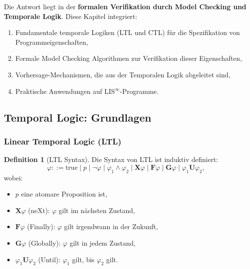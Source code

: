 \documentclass[a4paper,12pt]{article}
\theoremstyle{definition}
\newtheorem{definition}{Definition}
\begin{document}
Die Antwort liegt in der \textbf{formalen Verifikation durch Model Checking und Temporale Logik}. Diese Kapitel integriert:

\begin{enumerate}
	\item Fundamentale temporale Logiken (LTL und CTL) für die Spezifikation von Programmeigenschaften,
	\item Formale Model Checking Algorithmen zur Verifikation dieser Eigenschaften,
	\item Vorhersage-Mechanismen, die aus der Temporalen Logik abgeleitet sind,
	\item Praktische Anwendungen auf LIS$^{\infty}$-Programme.
\end{enumerate}

\subsection{Temporal Logic: Grundlagen}

\subsubsection{Linear Temporal Logic (LTL)}

\begin{definition}[LTL Syntax]
	\label{def:ltl_syntax}
	Die Syntax von LTL ist induktiv definiert:
	\[
	\varphi ::= \text{true} \mid p \mid \neg \varphi \mid \varphi_1 \land \varphi_2 \mid \mathbf{X}\varphi \mid \mathbf{F}\varphi \mid \mathbf{G}\varphi \mid \varphi_1 \mathbf{U} \varphi_2,
	\]
	wobei:
	\begin{itemize}
		\item $p$ eine atomare Proposition ist,
		\item $\mathbf{X}\varphi$ (neXt): $\varphi$ gilt im nächsten Zustand,
		\item $\mathbf{F}\varphi$ (Finally): $\varphi$ gilt irgendwann in der Zukunft,
		\item $\mathbf{G}\varphi$ (Globally): $\varphi$ gilt in jedem Zustand,
		\item $\varphi_1 \mathbf{U} \varphi_2$ (Until): $\varphi_1$ gilt, bis $\varphi_2$ gilt.
	\end{itemize}
\end{definition}
\end{document}
